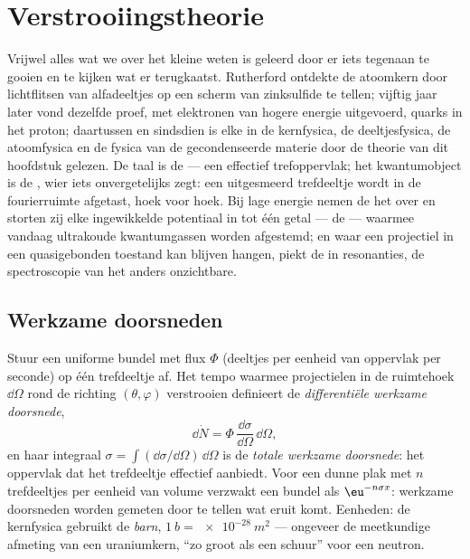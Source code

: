 \chapter{Verstrooiingstheorie}\label{ch:b3:scattering-theory}

Vrijwel alles wat we over het kleine weten is geleerd door er iets tegenaan
te gooien en te kijken wat er terugkaatst. Rutherford ontdekte de
atoomkern door lichtflitsen van alfadeeltjes op een scherm van zinksulfide
te tellen; vijftig jaar later vond dezelfde proef, met elektronen van
hogere energie uitgevoerd, quarks in het proton; daartussen en sindsdien
is elke  in de kernfysica, de deeltjesfysica, de
atoomfysica en de fysica van de gecondenseerde materie door de theorie van
dit hoofdstuk gelezen. De taal is de \emph{} --- een
effectief trefoppervlak; het kwantumobject is de
\emph{}, wier  iets onvergetelijks
zegt: een uitgesmeerd trefdeeltje wordt in de fourierruimte afgetast, hoek
voor hoek. Bij lage energie nemen de  het over en storten
zij elke ingewikkelde potentiaal in tot één getal --- de
 --- waarmee vandaag ultrakoude kwantumgassen worden
afgestemd; en waar een projectiel in een quasigebonden toestand kan blijven
hangen, piekt de  in resonanties, de spectroscopie van
het anders onzichtbare.

\section{Werkzame doorsneden}

\begin{definition}\label{def:b3:scattering-theory:cross-section}
Stuur een uniforme bundel met flux $\Phi$ (deeltjes per eenheid van
oppervlak per seconde) op één trefdeeltje af. Het tempo waarmee
projectielen in de ruimtehoek $\dd\Omega$ rond de richting $(\theta,
\varphi)$ verstrooien definieert de \emph{differentiële werkzame
doorsnede},
\[
\dd\dot N = \Phi\,\frac{\dd\sigma}{\dd\Omega}\,\dd\Omega ,
\]
en haar integraal $\sigma = \int(\dd\sigma/\dd\Omega)\,\dd\Omega$ is de
\emph{totale werkzame doorsnede}: het oppervlak dat het trefdeeltje
effectief aanbiedt. Voor een dunne plak met $n$ trefdeeltjes per eenheid
van volume verzwakt een bundel als $\eu^{-n\sigma x}$: werkzame doorsneden
worden gemeten door te tellen wat eruit komt. Eenheden: de kernfysica
gebruikt de \emph{barn}, $\qty{1}{b} = \qty{e-28}{m^2}$ --- ongeveer de
meetkundige afmeting van een uraniumkern, ``zo groot als een schuur'' voor
een neutron.
\end{definition}

